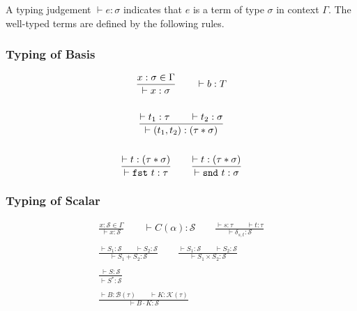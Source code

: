   A typing judgement $\vdash e : \sigma$ indicates that $e$ is a term of type $\sigma$ in context $\Gamma$. The well-typed terms are defined by the following rules.

\subsubsection*{Typing of Basis}
  \begin{gather*}
    \frac{x : \sigma \in \Gamma}{\vdash x : \sigma}
    \qquad 
    \vdash b : T\\
    \\
    \frac{\vdash t_1 : \tau \qquad \vdash t_2 : \sigma}{\vdash (t_1, t_2) : ( \tau * \sigma )} \\
    \\
    \frac{\vdash t : ( \tau * \sigma )}{\vdash \texttt{fst}\ t : \tau}
    \qquad
    \frac{\vdash t : ( \tau * \sigma )}{\vdash \texttt{snd}\ t : \sigma}
  \end{gather*}

\subsubsection*{Typing of Scalar}
  \begin{gather*}
    \frac{x : \mathcal{S} \in \Gamma}{\vdash x : \mathcal{S}}
    \qquad 
    \vdash C(\alpha) : \mathcal{S}
    \qquad
    \frac{\vdash s : \tau \qquad \vdash t : \tau}{\vdash \delta_{s, t} : \mathcal{S}} \\
    \\
    \frac{\vdash S_1 : \mathcal{S} \qquad \vdash S_2 : \mathcal{S}}{\vdash S_1 + S_2 : \mathcal{S}}
    \qquad
    \frac{\vdash S_1 : \mathcal{S} \qquad \vdash S_2 : \mathcal{S}}{\vdash S_1 \times S_2 : \mathcal{S}} \\
    \\
    \frac{\vdash S : \mathcal{S}}{\vdash S^* : \mathcal{S}} \\
    \\
    \frac{\vdash B : \mathcal{B}(\tau) \qquad \vdash K : \mathcal{K}(\tau)}{\vdash B \cdot K : \mathcal{S}}
  \end{gather*}


